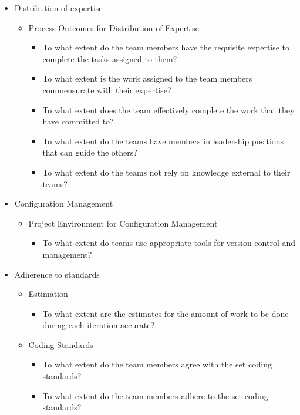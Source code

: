 \begin{itemize}
	\item Distribution of expertise 
		\begin{itemize}
			\item Process Outcomes for Distribution of Expertise
				\begin{itemize}
					\item To what extent do the team members have the requisite expertise to complete the tasks assigned to them? 
					\item To what extent is the work assigned to the team members commensurate with their expertise? 
					\item To what extent does the team effectively complete the work that they have committed to? 
					\item To what extent do the teams have members in leadership positions that can guide the others? 
					\item To what extent do the teams not rely on knowledge external to their teams? 
				\end{itemize}
		\end{itemize}
	\item Configuration Management
		\begin{itemize}
			\item Project Environment for Configuration Management
				\begin{itemize}
					\item To what extent do teams use appropriate tools for version control and management?
				\end{itemize}
		\end{itemize}
	\item Adherence to standards
		\begin{itemize}
			\item Estimation
				\begin{itemize}
					\item To what extent are the estimates for the amount of work to be done during each iteration accurate?
				\end{itemize}
			\item Coding Standards
				\begin{itemize}
					\item To what extent do the team members agree with the set coding standards? 
					\item To what extent do the team members adhere to the set coding standards?

\end{itemize}
\end{itemize}
\end{itemize}
